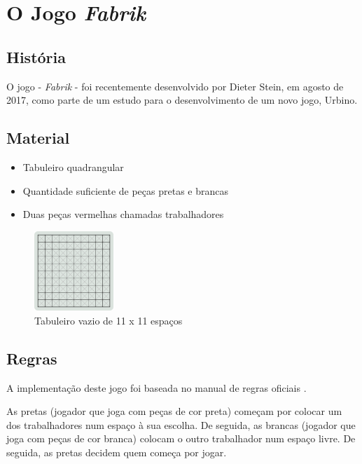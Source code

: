 \documentclass[a4paper]{article}
\begin{document}
\newpage

\section{O Jogo \textit{Fabrik}}

\subsection{História}
O jogo - \textit{Fabrik} - foi recentemente desenvolvido por Dieter Stein, em agosto de 2017, como parte de um estudo para o desenvolvimento de um novo jogo, Urbino.

\subsection{Material}
\begin{itemize}
	\item Tabuleiro quadrangular
	\item Quantidade suficiente de peças pretas e brancas
	\item Duas peças vermelhas chamadas trabalhadores
\end{itemize}

\begin{figure}[h!]
\begin{center}
\includegraphics[height=3cm,width=3cm]{images/fabrik_empty_board.png}
\caption{Tabuleiro vazio de 11 x 11 espaços}
\label{Figura 1}
\end{center}
\end{figure}

\subsection{Regras}
A implementação deste jogo foi baseada no manual de regras oficiais \cite{games_and_puzzles_by_dieter_stein}.

As pretas (jogador que joga com peças de cor preta) começam por colocar um dos trabalhadores num espaço à sua escolha. De seguida, as brancas (jogador que joga com peças de cor branca) colocam o outro trabalhador num espaço livre. De seguida, as pretas decidem quem começa por jogar.
\end{document}
